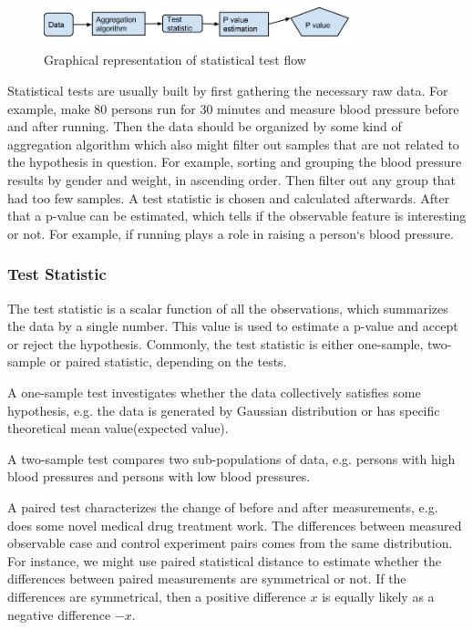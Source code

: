 \documentclass[12pt]{article}
\begin{document}
{\begin{figure}[H]
  \centering
  \includegraphics[width=0.8\textwidth]{statisticalTestFlow}
  \caption{Graphical representation of statistical test flow}
  \label{fig:statisticalTestFlow}
\end{figure}

Statistical tests are usually built by first gathering the necessary raw data. For example, make 80 persons run for 30 minutes and measure blood pressure before and after running. Then the data should be organized by some kind of aggregation algorithm which also might filter out samples that are not related to the hypothesis in question. For example, sorting and grouping the blood pressure results by gender and weight, in ascending order. Then filter out any group that had too few samples. A test statistic is chosen and calculated afterwards. After that a p-value can be estimated, which tells if the observable feature is interesting or not. For example, if running plays a role in raising a person`s blood pressure.

\subsubsection{Test Statistic}

The test statistic is a scalar function of all the observations, which summarizes the data by a single number. This value is used to estimate a p-value and accept or reject the hypothesis. Commonly, the test statistic is either one-sample, two-sample or paired statistic, depending on the tests.

A one-sample test investigates whether the data collectively satisfies some hypothesis, e.g. the data is generated by Gaussian distribution or has specific theoretical mean value(expected value).

A two-sample test compares two sub-populations of data, e.g. persons with high blood pressures and persons with low blood pressures.

A paired test characterizes the change of before and after measurements, e.g. does some novel medical drug treatment work. The differences between measured observable case and control experiment pairs comes from the same distribution. For instance, we might use paired statistical distance to estimate whether the differences between paired measurements are symmetrical or not. If the differences are symmetrical, then a positive difference $x$ is equally likely as a negative difference $-x$.

}
\end{document}
